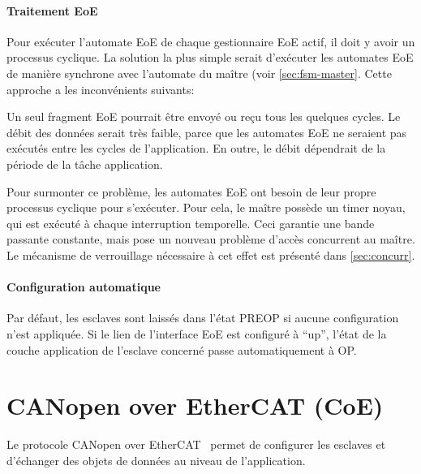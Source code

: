 \documentclass[a4paper,12pt,BCOR6mm,bibtotoc,idxtotoc]{scrbook}
\begin{document}
\paragraph{Traitement EoE}

Pour ex\'ecuter l'automate EoE de chaque gestionnaire EoE actif, il
doit y avoir un processus cyclique.  La solution la plus simple serait
d'ex\'ecuter les automates EoE de mani\`ere synchrone avec l'automate
du ma\^itre (voir \autoref{sec:fsm-master}.  Cette approche a les
inconv\'enients suivants:

Un seul fragment EoE pourrait \^etre envoy\'e ou re\c{c}u tous les
quelques cycles.  Le d\'ebit des donn\'ees serait tr\`es faible, parce
que les automates EoE ne seraient pas ex\'ecut\'es entre les cycles de
l'application.  En outre, le d\'ebit d\'ependrait de la p\'eriode de
la t\^ache application.

Pour surmonter ce probl\`eme, les automates EoE ont besoin de leur
propre processus cyclique pour s'ex\'ecuter.  Pour cela, le ma\^itre
poss\`ede un timer noyau, qui est ex\'ecut\'e \`a chaque interruption
temporelle.  Ceci garantie une bande passante constante, mais pose un
nouveau probl\`eme d'acc\`es concurrent au ma\^itre.  Le m\'ecanisme
de verrouillage n\'ecessaire \`a cet effet est pr\'esent\'e dans
\autoref{sec:concurr}.

\paragraph{Configuration automatique}

Par d\'efaut, les esclaves sont laiss\'es dans l'\'etat PREOP si
aucune configuration n'est appliqu\'ee.  Si le lien de l'interface EoE
est configur\'e \`a ``up'', l'\'etat de la couche application de
l'esclave concern\'e passe automatiquement \`a OP.


\section{CANopen over EtherCAT (CoE)}
\label{sec:coe}

Le protocole CANopen over EtherCAT~\cite[sec.~5.6]{alspec} permet de
configurer les esclaves et d'\'echanger des objets de donn\'ees au
niveau de l'application.

%
%
\end{document}
